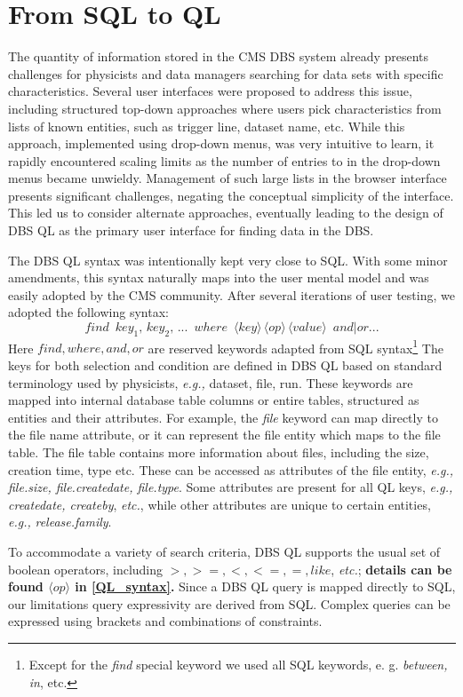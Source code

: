 \documentclass[a4paper]{jpconf}
\begin{document}
\section{From SQL to QL}

The quantity of information stored in the CMS DBS system already
presents challenges for physicists and data managers searching for
data sets with specific characteristics.
Several user interfaces were proposed to address this issue, including
structured top-down approaches where users pick characteristics
from lists of known entities, such as
trigger line, dataset name, etc.
While this approach, implemented using drop-down menus,
was very intuitive to learn,
it rapidly encountered scaling limits as the number of entries to in the drop-down menus
became unwieldy.
Management of such large lists in the browser interface presents significant challenges,
negating the conceptual simplicity of the interface. This led us to consider alternate
approaches, eventually leading to the design of
DBS QL as the primary user interface for finding data in the DBS.

The DBS QL syntax was intentionally kept very close to SQL.  With some minor amendments, this syntax naturally
maps into the user mental model and was easily adopted by the CMS
community. After several iterations of user testing, we adopted the following syntax:
\[
find\,\,\,
key_1,\, key_2,\, ...\,\,\, where\,\,\,
\langle key\rangle\, 
\langle op\rangle\, 
\langle value\rangle \,\,\, and|or ...
\label{QL_syntax}
\]
Here $find, where, and, or$ are reserved keywords
adapted from SQL syntax\footnote{Except for the {\it find} special
keyword we used all SQL keywords, e. g. {\it between, in}, etc.}
The keys for both selection and condition are defined
in DBS QL based on standard terminology used by physicists, {\it e.g.,} dataset, file, run. 
These keywords are mapped into internal database table columns or entire tables,
structured as entities and their attributes. For example,
the {\it file} keyword can map directly to the file name attribute, or it can represent the file
entity which maps to the file table. The file table
contains more information about files, including the size, creation time,
type etc. These can be accessed as attributes of the file entity, {\it e.g.,}
{\it file.size, file.createdate, file.type}. Some attributes
are present for all QL keys, {\it e.g.,} {\it createdate, createby}, {\it etc.},
while other attributes are unique to certain entities, {\it e.g.,} {\it release.family}.

To accommodate a variety of search criteria, DBS QL supports
the usual set of boolean operators, including $>, >=, <, <=, =, like$, {\it etc.};
{\bf
details can be found $\langle op\rangle$ in \ref{QL_syntax}.
}
Since a DBS QL query is mapped directly to SQL, our limitations query expressivity
are derived from SQL.  Complex queries can be expressed using
brackets and combinations of constraints.
\end{document}
